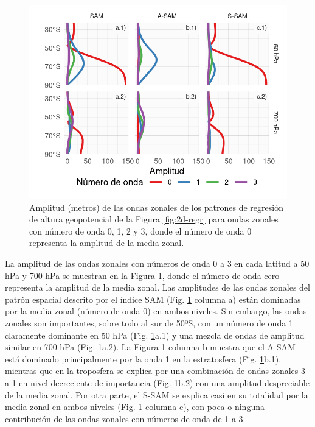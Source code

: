 \documentclass[12pt,oneside]{reedthesis}
\begin{document}
\begin{figure}
\includegraphics{figures/30-sam/wave-amplitude-1} \caption{Amplitud (metros) de las ondas zonales de los patrones de regresión de altura geopotencial de la Figura \ref{fig:2d-regr} para ondas zonales con número de onda 0, 1, 2 y 3, donde el número de onda 0 representa la amplitud de la media zonal.}\label{fig:wave-amplitude}
\end{figure}

La amplitud de las ondas zonales con números de onda 0 a 3 en cada latitud a 50 hPa y 700 hPa se muestran en la Figura \ref{fig:wave-amplitude}, donde el número de onda cero representa la amplitud de la media zonal.
Las amplitudes de las ondas zonales del patrón espacial descrito por el índice SAM (Fig. \ref{fig:wave-amplitude} columna a) están dominadas por la media zonal (número de onda 0) en ambos niveles.
Sin embargo, las ondas zonales son importantes, sobre todo al sur de 50ºS, con un número de onda 1 claramente dominante en 50 hPa (Fig. \ref{fig:wave-amplitude}a.1) y una mezcla de ondas de amplitud similar en 700 hPa (Fig. \ref{fig:wave-amplitude}a.2).
La Figura \ref{fig:wave-amplitude} columna b muestra que el A-SAM está dominado principalmente por la onda 1 en la estratosfera (Fig. \ref{fig:wave-amplitude}b.1), mientras que en la troposfera se explica por una combinación de ondas zonales 3 a 1 en nivel decreciente de importancia (Fig. \ref{fig:wave-amplitude}b.2) con una amplitud despreciable de la media zonal.
Por otra parte, el S-SAM se explica casi en su totalidad por la media zonal en ambos niveles (Fig. \ref{fig:wave-amplitude} columna c), con poca o ninguna contribución de las ondas zonales con números de onda de 1 a 3.
\end{document}
